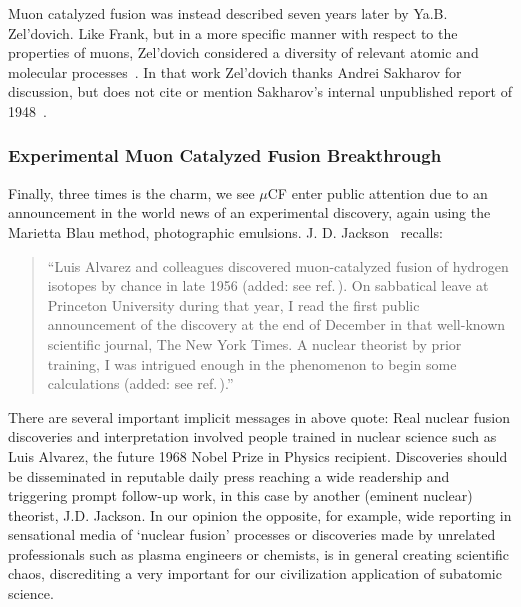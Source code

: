 \documentclass[particles,article,accept,pdftex,moreauthors]{Definitions/mdpi}
\begin{document}
Muon catalyzed fusion was instead described seven years later by Ya.B. Zel'dovich. Like Frank, but in a more specific manner with respect to the properties of muons, Zel'dovich considered a diversity of relevant atomic and molecular processes~\cite{Zel:1954}. In that work Zel'dovich thanks Andrei Sakharov for discussion, but does not cite or mention Sakharov's internal unpublished report of 1948~\cite{Sakharov:1989P}.

\subsubsection{Experimental Muon Catalyzed Fusion Breakthrough}\label{ssec:muCFexp}
Finally, three times is the charm, we see $\mu$CF enter public attention due to an announcement in the world news of an experimental discovery, again using the Marietta Blau method, photographic emulsions. J. D. Jackson~\cite{Jackson:2010Rem} recalls:
\begin{quote}
``Luis Alvarez and colleagues discovered muon-catalyzed fusion of hydrogen isotopes by chance in late 1956 (added: see ref.\,\cite{Alvarez:1957un}). On sabbatical leave at Princeton University during that year, I read the first public announcement of the discovery at the end of December in that well-known scientific journal, The New York Times. A nuclear theorist by prior training, I was intrigued enough in the phenomenon to begin some calculations (added: see ref.\,\cite{Jackson:2010Rem}).''
\end{quote}
There are several important implicit messages in above quote: Real nuclear fusion discoveries and interpretation involved people trained in nuclear science such as Luis Alvarez, the future 1968 Nobel Prize in Physics recipient. Discoveries should be disseminated in reputable daily press reaching a wide readership and triggering prompt follow-up work, in this case by another (eminent nuclear) theorist, J.D. Jackson. In our opinion the opposite, for example, wide reporting in sensational media of `nuclear fusion' processes or discoveries made by unrelated professionals such as plasma engineers or chemists, is in general creating scientific chaos, discrediting a very important for our civilization application of subatomic science.
\end{document}
